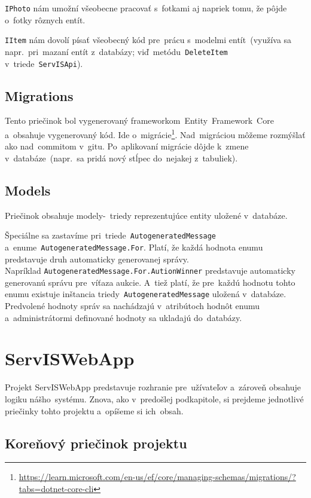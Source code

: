 \verb|IPhoto| nám umožní všeobecne pracovať s~fotkami aj napriek tomu, že pôjde o~fotky rôznych entít.

\verb|IItem| nám dovolí písať všeobecný kód pre~prácu s~modelmi entít~(využíva sa napr.~pri~mazaní entít z~databázy; viď~metódu~\verb|DeleteItem| v~triede~\verb|ServISApi|).

\subsection{Migrations}

Tento priečinok bol vygenerovaný frameworkom~Entity~Framework~Core a~obsahuje vygenerovaný kód. Ide o~migrácie\footnote{\url{https://learn.microsoft.com/en-us/ef/core/managing-schemas/migrations/?tabs=dotnet-core-cli}}. Nad~migráciou môžeme rozmýšlať ako nad~commitom v~gitu. Po~aplikovaní migrácie dôjde k~zmene v~databáze~(napr.~sa pridá nový stĺpec do~nejakej z~tabuliek).

\subsection{Models}
\label{models}

Priečinok obsahuje modely-~triedy reprezentujúce entity uložené v~databáze.

Špeciálne sa zastavíme pri~triede~\verb|AutogeneratedMessage|\\a~enume~\verb|AutogeneratedMessage.For|. Platí, že každá hodnota enumu predstavuje druh automaticky generovanej správy.\\Napríklad \verb|AutogeneratedMessage.For.AutionWinner| predstavuje automaticky generovanú správu pre~víťaza aukcie. A~tiež platí, že pre~každú hodnotu tohto enumu existuje inštancia triedy~\verb|AutogeneratedMessage| uložená v~databáze.\\Pred\-vo\-le\-né hodnoty správ sa nachádzajú v~atribútoch hodnôt enumu a~administrátormi definované hodnoty sa ukladajú do~databázy.

\section{ServISWebApp}

Projekt ServISWebApp predstavuje rozhranie pre~užívateľov a~zároveň obsahuje logiku nášho~systému. Znova, ako v~predošlej podkapitole, si prejdeme jednotlivé priečinky tohto projektu a~opíšeme si ich~obsah.

\subsection{Koreňový priečinok projektu}

